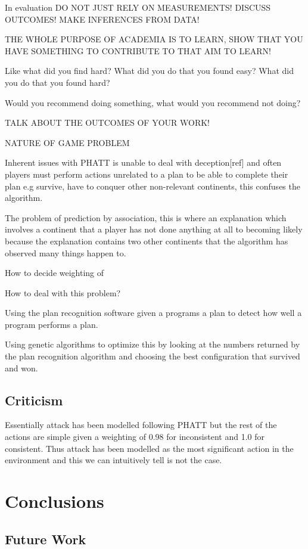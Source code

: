\documentclass[parskip]{cs4rep}
\begin{document}
In evaluation DO NOT JUST RELY ON MEASUREMENTS! DISCUSS OUTCOMES! MAKE INFERENCES FROM DATA!

THE WHOLE PURPOSE OF ACADEMIA IS TO LEARN, SHOW THAT YOU HAVE SOMETHING TO CONTRIBUTE TO THAT AIM TO LEARN!

Like what did you find hard? What did you do that you found easy? What did you do that you found hard? 

Would you recommend doing something, what would you recommend not doing?

TALK ABOUT THE OUTCOMES OF YOUR WORK!

NATURE OF GAME PROBLEM

Inherent issues with PHATT is unable to deal with deception[ref] and often players must perform actions unrelated to a plan to be able to complete their plan e.g survive, have to conquer other non-relevant continents, this confuses the algorithm.

The problem of prediction by association, this is where an explanation which involves a continent that a player has not done anything at all to becoming likely because the explanation contains two other continents that the algorithm has observed many things happen to.

How to decide weighting of 

How to deal with this problem?

Using the plan recognition software given a programs a plan to detect how well a program performs a plan. 

Using genetic algorithms to optimize this by looking at the numbers returned by the plan recognition algorithm and choosing the best configuration that survived and won.

\section{Criticism}

Essentially attack has been modelled following PHATT but the rest of the actions are simple given a weighting of 0.98 for inconsistent and 1.0 for consistent. Thus attack has been modelled as the most significant action in the environment and this we can intuitively tell is not the case.

\chapter{Conclusions}

\section{Future Work}
\end{document}
